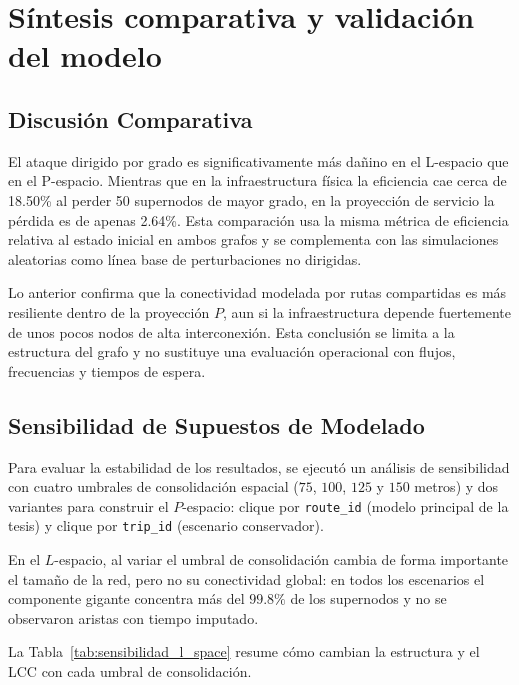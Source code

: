     \section{Síntesis comparativa y validación del modelo}

        \subsection{Discusión Comparativa}
            El ataque dirigido por grado es significativamente más dañino en el L-espacio que en el P-espacio. Mientras que en la infraestructura física la eficiencia cae cerca de 18.50\% al perder 50 supernodos de mayor grado, en la proyección de servicio la pérdida es de apenas 2.64\%. Esta comparación usa la misma métrica de eficiencia relativa al estado inicial en ambos grafos y se complementa con las simulaciones aleatorias como línea base de perturbaciones no dirigidas.

            Lo anterior confirma que la conectividad modelada por rutas compartidas es más resiliente dentro de la proyección \(P\), aun si la infraestructura depende fuertemente de unos pocos nodos de alta interconexión. Esta conclusión se limita a la estructura del grafo y no sustituye una evaluación operacional con flujos, frecuencias y tiempos de espera.
	
        \subsection{Sensibilidad de Supuestos de Modelado}
            Para evaluar la estabilidad de los resultados, se ejecutó un análisis de sensibilidad con cuatro umbrales de consolidación espacial (\(75\), \(100\), \(125\) y \(150\) metros) y dos variantes para construir el \(P\)-espacio: clique por \texttt{route\_id} (modelo principal de la tesis) y clique por \texttt{trip\_id} (escenario conservador).

            En el \(L\)-espacio, al variar el umbral de consolidación cambia de forma importante el tamaño de la red, pero no su conectividad global: en todos los escenarios el componente gigante concentra más del \(99.8\%\) de los supernodos y no se observaron aristas con tiempo imputado.

            La Tabla~\ref{tab:sensibilidad_l_space} resume cómo cambian la estructura y el LCC con cada umbral de consolidación.

